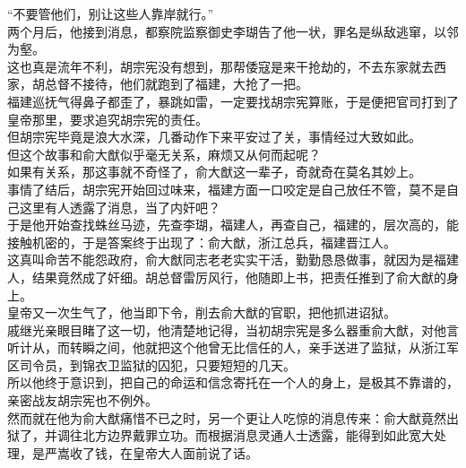 \begin{multicols}{\theparacolNo}
“不要管他们，别让这些人靠岸就行。”\\

两个月后，他接到消息，都察院监察御史李瑚告了他一状，罪名是纵敌逃窜，以邻为壑。\\

这也真是流年不利，胡宗宪没有想到，那帮倭寇是来干抢劫的，不去东家就去西家，胡总督不接待，他们就跑到了福建，大抢了一把。\\

福建巡抚气得鼻子都歪了，暴跳如雷，一定要找胡宗宪算账，于是便把官司打到了皇帝那里，要求追究胡宗宪的责任。\\

但胡宗宪毕竟是浪大水深，几番动作下来平安过了关，事情经过大致如此。\\

但这个故事和俞大猷似乎毫无关系，麻烦又从何而起呢？\\

如果有关系，那这事就不奇怪了，俞大猷这一辈子，奇就奇在莫名其妙上。\\

事情了结后，胡宗宪开始回过味来，福建方面一口咬定是自己放任不管，莫不是自己这里有人透露了消息，当了内奸吧？\\

于是他开始查找蛛丝马迹，先查李瑚，福建人，再查自己，福建的，层次高的，能接触机密的，于是答案终于出现了：俞大猷，浙江总兵，福建晋江人。\\

这真叫命苦不能怨政府，俞大猷同志老老实实干活，勤勤恳恳做事，就因为是福建人，结果竟然成了奸细。胡总督雷厉风行，他随即上书，把责任推到了俞大猷的身上。\\

皇帝又一次生气了，他当即下令，削去俞大猷的官职，把他抓进诏狱。\\

戚继光亲眼目睹了这一切，他清楚地记得，当初胡宗宪是多么器重俞大猷，对他言听计从，而转瞬之间，他就把这个他曾无比信任的人，亲手送进了监狱，从浙江军区司令员，到锦衣卫监狱的囚犯，只要短短的几天。\\

所以他终于意识到，把自己的命运和信念寄托在一个人的身上，是极其不靠谱的，亲密战友胡宗宪也不例外。\\

然而就在他为俞大猷痛惜不已之时，另一个更让人吃惊的消息传来：俞大猷竟然出狱了，并调往北方边界戴罪立功。而根据消息灵通人士透露，能得到如此宽大处理，是严嵩收了钱，在皇帝大人面前说了话。\\


\end{multicols}
